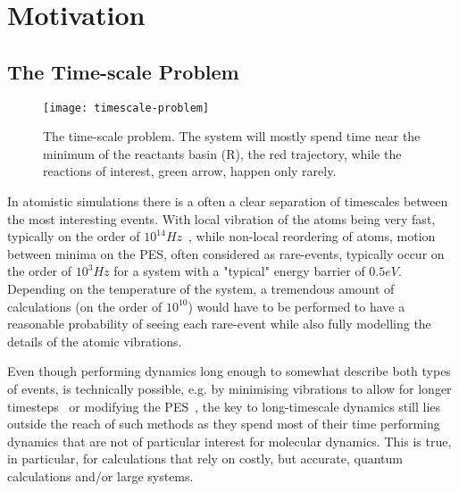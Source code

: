 
\section{Motivation}
\subsection{The Time-scale Problem}
\label{sec:tst-timescale-problem}

\begin{figure}[h]
\begin{center}
\texttt{[image: timescale-problem]}
    \parbox{0.85\linewidth}{
\caption{The time-scale problem.
The system will mostly spend time near the minimum of the reactants basin (R), the red trajectory, while the reactions of interest, green arrow, happen only rarely.}
\label{fig:timescale-problem}
    }
\end{center}
\end{figure}

In atomistic simulations there is a often a clear separation of timescales between the most interesting events.
With local vibration of the atoms being very fast, typically on the order of $10^{14} \unit{Hz}$~\cite{mcquarrie-1983},
while non-local reordering of atoms, motion between minima on the PES, often considered as rare-events, typically occur on the order of $10^3 \unit{Hz}$ for a system with a "typical" energy barrier of $0.5 \unit{eV}$.
Depending on the temperature of the system, a tremendous amount of calculations (on the order of $10^{10}$) would have to be performed to have a reasonable probability of seeing each rare-event while also fully modelling the details of the atomic vibrations.

Even though performing dynamics long enough to somewhat describe both types of events, is technically possible, e.g. by minimising vibrations to allow for longer timesteps~\cite{shake-1977, rattle-1983} or modifying the PES~\cite{hyperdynamics-voter-1997}, the key to long-timescale dynamics still lies outside the reach of such methods as they spend most of their time performing dynamics that are not of particular interest for molecular dynamics.
This is true, in particular, for calculations that rely on costly, but accurate, quantum calculations and/or large systems.

